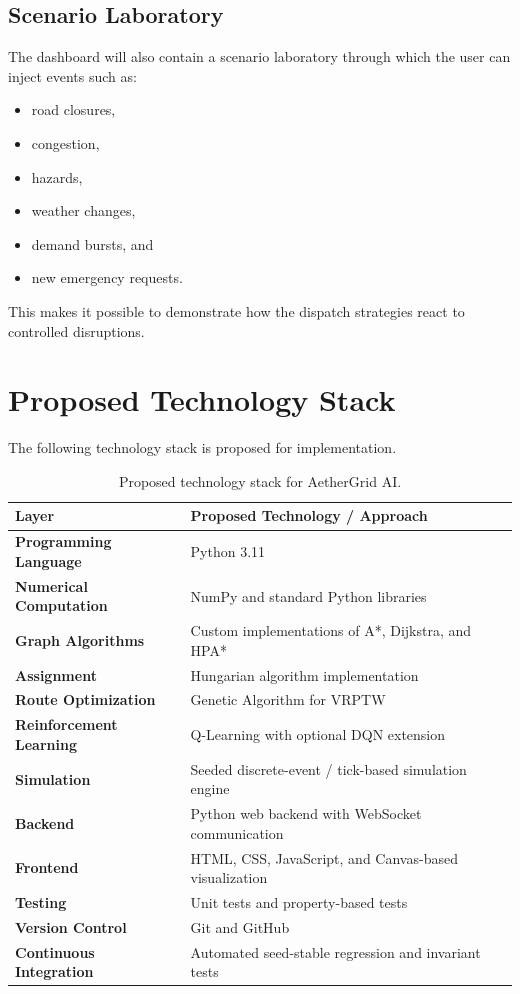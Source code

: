 \documentclass[12pt,a4paper]{article}
\begin{document}
\subsection{Scenario Laboratory}

The dashboard will also contain a scenario laboratory through which
the user can inject events such as:

\begin{itemize}
    \item road closures,
    \item congestion,
    \item hazards,
    \item weather changes,
    \item demand bursts, and
    \item new emergency requests.
\end{itemize}

This makes it possible to demonstrate how the dispatch strategies
react to controlled disruptions.





\section{Proposed Technology Stack}

The following technology stack is proposed for implementation.

\begin{table}[ht]
\centering
\renewcommand{\arraystretch}{1.35}
\begin{tabularx}{\textwidth}{>{\bfseries}p{4.0cm}X}
\toprule
Layer & Proposed Technology / Approach \\
\midrule
Programming Language & Python 3.11 \\
Numerical Computation & NumPy and standard Python libraries \\
Graph Algorithms & Custom implementations of A*, Dijkstra, and HPA* \\
Assignment & Hungarian algorithm implementation \\
Route Optimization & Genetic Algorithm for VRPTW \\
Reinforcement Learning & Q-Learning with optional DQN extension \\
Simulation & Seeded discrete-event / tick-based simulation engine \\
Backend & Python web backend with WebSocket communication \\
Frontend & HTML, CSS, JavaScript, and Canvas-based visualization \\
Testing & Unit tests and property-based tests \\
Version Control & Git and GitHub \\
Continuous Integration & Automated seed-stable regression and invariant tests \\
\bottomrule
\end{tabularx}
\caption{Proposed technology stack for AetherGrid AI.}
\label{tab:techstack}
\end{table}
\end{document}
